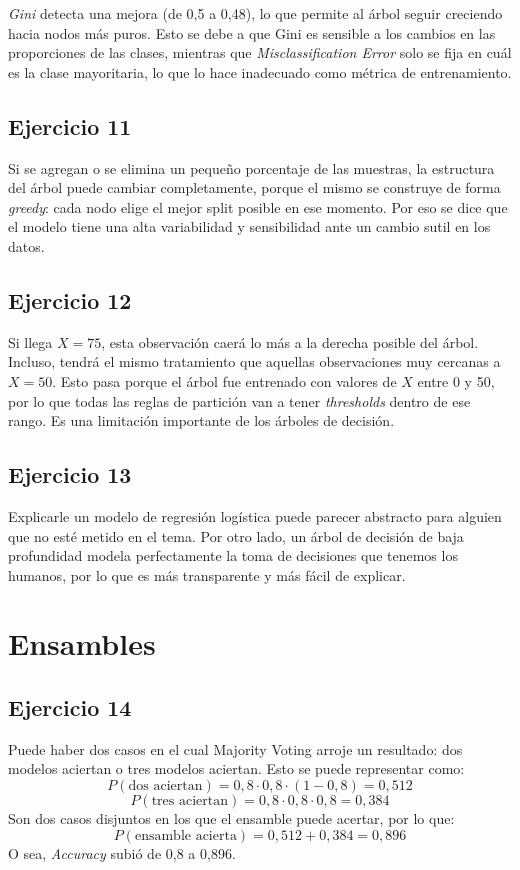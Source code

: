 \documentclass[a4paper,12pt]{article}
\begin{document}
            \noindent \textit{Gini} detecta una mejora (de 0,5 a 0,48), lo que permite al árbol seguir creciendo hacia nodos más puros. Esto se debe a que Gini es sensible a los cambios en las proporciones de las clases, mientras que \textit{Misclassification Error} solo se fija en cuál es la clase mayoritaria, lo que lo hace inadecuado como métrica de entrenamiento.
        \subsection*{Ejercicio 11}
            \noindent Si se agregan o se elimina un pequeño porcentaje de las muestras, la estructura del árbol puede cambiar completamente, porque el mismo se construye de forma \textit{greedy}: cada nodo elige el mejor split posible en ese momento. Por eso se dice que el modelo tiene una alta variabilidad y sensibilidad ante un cambio sutil en los datos.
        \subsection*{Ejercicio 12}
            \noindent Si llega \(X = 75\), esta observación caerá lo más a la derecha posible del árbol. Incluso, tendrá el mismo tratamiento que aquellas observaciones muy cercanas a \(X = 50\). Esto pasa porque el árbol fue entrenado con valores de $X$ entre 0 y 50, por lo que todas las reglas de partición van a tener \textit{thresholds} dentro de ese rango. Es una limitación importante de los árboles de decisión.
        \subsection*{Ejercicio 13}
            \noindent Explicarle un modelo de regresión logística puede parecer abstracto para alguien que no esté metido en el tema. Por otro lado, un árbol de decisión de baja profundidad modela perfectamente la toma de decisiones que tenemos los humanos, por lo que es más transparente y más fácil de explicar.
    \section*{Ensambles}
        \subsection*{Ejercicio 14}
            \noindent Puede haber dos casos en el cual Majority Voting arroje un resultado: dos modelos aciertan o tres modelos aciertan. Esto se puede representar como:
            \[P(\text{dos aciertan}) = 0,8 \cdot 0,8 \cdot (1-0,8) = 0,512\]
            \[P(\text{tres aciertan}) = 0,8 \cdot 0,8 \cdot 0,8 = 0,384\]
            \noindent Son dos casos disjuntos en los que el ensamble puede acertar, por lo que:
            \[P(\text{ensamble acierta}) = 0,512 + 0,384 = 0,896\]
            \noindent O sea, \textit{Accuracy} subió de 0,8 a 0,896.
\end{document}
